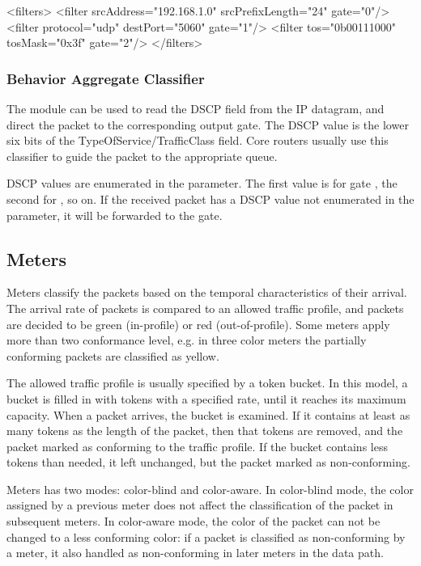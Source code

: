 \begin{XML}
<filters>
  <filter srcAddress="192.168.1.0" srcPrefixLength="24" gate="0"/>
  <filter protocol="udp" destPort="5060" gate="1"/>
  <filter tos="0b00111000" tosMask="0x3f" gate="2"/>
</filters>
\end{XML}

\subsubsection*{Behavior Aggregate Classifier}

The  module can be used to read
the DSCP field from the IP datagram, and direct the packet to
the corresponding output gate. The DSCP value is the lower
six bits of the TypeOfService/TrafficClass field. Core routers
usually use this classifier to guide the packet to the appropriate
queue.

DSCP values are enumerated in the  parameter.
The first value is for gate , the second for
, so on. If the received packet has a DSCP
value not enumerated in the  parameter, it will
be forwarded to the  gate.

\subsection{Meters}
\label{sec:diffserv:meters}

Meters classify the packets based on the temporal characteristics
of their arrival. The arrival rate of packets is compared to an
allowed traffic profile, and packets are decided to be green
(in-profile) or red (out-of-profile). Some meters apply more than two
conformance level, e.g. in three color meters the partially conforming
packets are classified as yellow.

The allowed traffic profile is usually specified by a token bucket.
In this model, a bucket is filled in with tokens with a specified rate,
until it reaches its maximum capacity. When a packet arrives, the
bucket is examined. If it contains at least as many tokens as the
length of the packet, then that tokens are removed, and the packet
marked as conforming to the traffic profile. If the bucket contains
less tokens than needed, it left unchanged, but the packet marked
as non-conforming.

Meters has two modes: color-blind and color-aware.
In color-blind mode, the color assigned by a previous meter does not
affect the classification of the packet in subsequent meters.
In color-aware mode, the color of the packet can not be changed to a less
conforming color: if a packet is classified as non-conforming by a meter,
it also handled as non-conforming in later meters in the data path.

